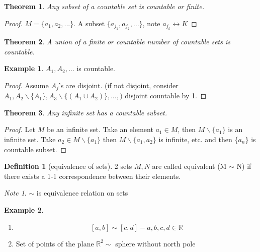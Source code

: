 \documentclass[11pt,a4paper]{report}
\theoremstyle{plain}
\newtheorem{thm}{Theorem}[section]
\theoremstyle{definition}
\newtheorem*{defn}{Definition}
\newtheorem*{eg}{Example}
\theoremstyle{remark}
\newtheorem*{note}{Note}
\newcommand{\R}{\mathbb{R}}
\begin{document}
\begin{thm}
  Any subset of a countable set is countable or finite.
\end{thm}
\begin{proof}
$M=\{ a_1, a_2, ... \}$. A subset $\{a_{j_1}, a_{j_2}, ...\}$, note $a_{j_k} \leftrightarrow K$
\end{proof}

\begin{thm}
  A union of a finite or countable number of countable sets is countable.
\end{thm}
\begin{eg}
$A_1, A_2, ...$ is countable.
\end{eg}
\begin{proof}
Assume $A_j$'s are disjoint. (if not disjoint, consider\\
$A_1, A_2 \backslash \{A_1\}, A_3 \backslash \{(A_1 \cup A_2)\}, ..., )$ disjoint countable by 1.
\end{proof}

\begin{thm}\label{infinite_set_has_countable_subset}
  Any infinite set has a countable subset.
\end{thm}
\begin{proof}
Let $M$ be an infinite set. Take an element $a_1 \in M$, then $M\backslash\{a_1\}$ is an infinite set.
Take $a_2 \in M\backslash \{a_1\}$ then $M\backslash \{a_1, a_2\}$ is infinite, etc. and then $\{a_n\}$ is countable subset.
\end{proof}

\begin{defn}[equivalence of sets]
2 sets $M, N$ are called equivalent (M $\sim$ N) if there exists a 1-1 correspondence between their elements.
\end{defn}
\begin{note}
  $\sim$ is equivalence relation on sets
\end{note}

\begin{eg} \;\
  \begin{enumerate}
  \item \[ [a,b] \sim [c,d] - a,b,c,d \in \R \]

  \item Set of points of the plane $\R^2 \sim$ sphere without north pole
  \end{enumerate}
\end{eg}
\end{document}
